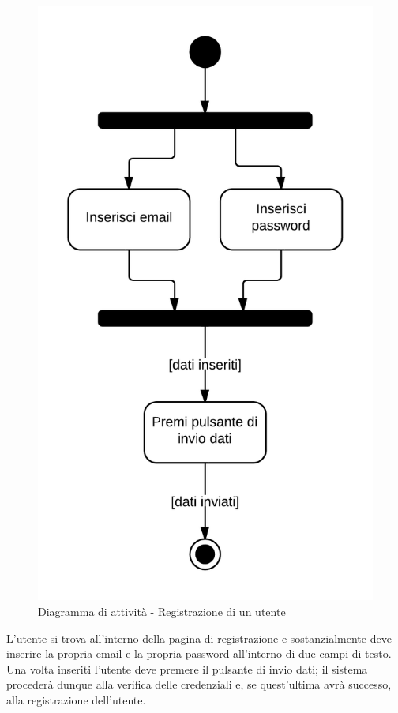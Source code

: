 \begin{figure}[H]
\centering
\includegraphics[scale=0.2]{uml/MaaP - Effettua registrazione.png}
\caption{Diagramma di attività - Registrazione di un utente}
\end{figure}

L'utente si trova all'interno della pagina di registrazione e sostanzialmente deve inserire la propria email e la propria password all'interno di due campi di testo. Una volta inseriti l'utente deve premere il pulsante di invio dati; il sistema  procederà dunque alla verifica delle credenziali e, se quest'ultima avrà successo, alla registrazione dell'utente.

